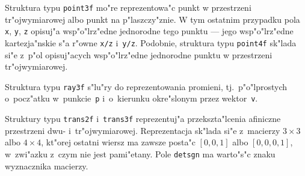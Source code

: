 Struktura typu \texttt{point3f} mo"re reprezentowa"c punkt w przestrzeni
tr"ojwymiarowej albo punkt na p"laszczy"znie. W tym ostatnim przypadku pola
\texttt{x}, \texttt{y}, \texttt{z} opisuj"a wsp"o"lrz"edne jednorodne tego
punktu --- jego wsp"o"lrz"edne kartezja"nskie s"a r"owne \texttt{x/z}
i~\texttt{y/z}. Podobnie, struktura typu \texttt{point4f} sk"lada si"e
z~p"ol opisuj"acych wsp"o"lrz"edne jednorodne punktu w przestrzeni
tr"ojwymiarowej.

\newpage
Struktura typu \texttt{ray3f} s"lu"ry do reprezentowania promieni, tj.\
p"o"lprostych o~pocz"atku w~punkcie~\texttt{p} i~o~kierunku okre"slonym
przez wektor~\texttt{v}.

\vspace{\bigskipamount}
Struktury typu \texttt{trans2f} i~\texttt{trans3f} reprezentuj"a
przekszta"lcenia afiniczne przestrzeni dwu- i~tr"ojwymiarowej. Reprezentacja
sk"lada si"e z~macierzy $3\times 3$ albo $4\times 4$, kt"orej ostatni wiersz
ma zawsze posta"c $[0,0,1]$ albo $[0,0,0,1]$, w~zwi"azku z~czym nie jest
pami"etany. Pole \texttt{detsgn} ma warto"s"c znaku wyznacznika macierzy.

